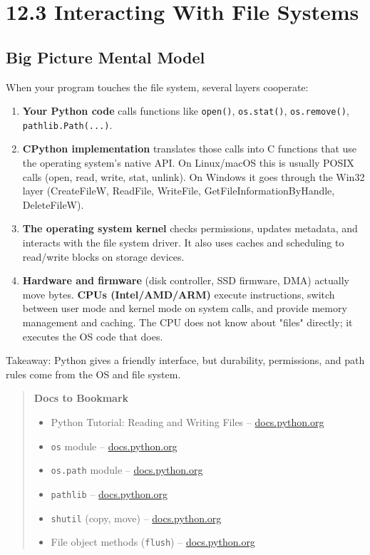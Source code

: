 \chapter{12.3 Interacting With File Systems}

\section*{Big Picture Mental Model}

When your program touches the file system, several layers cooperate:

\begin{enumerate}
  \item \textbf{Your Python code} calls functions like \texttt{open()}, \texttt{os.stat()}, \texttt{os.remove()}, \texttt{pathlib.Path(...)}.
  \item \textbf{CPython implementation} translates those calls into C functions that use the operating system's native API.
        On Linux/macOS this is usually POSIX calls (open, read, write, stat, unlink).
        On Windows it goes through the Win32 layer (CreateFileW, ReadFile, WriteFile, GetFileInformationByHandle, DeleteFileW).
  \item \textbf{The operating system kernel} checks permissions, updates metadata, and interacts with the file system driver.
        It also uses caches and scheduling to read/write blocks on storage devices.
  \item \textbf{Hardware and firmware} (disk controller, SSD firmware, DMA) actually move bytes.
        \textbf{CPUs (Intel/AMD/ARM)} execute instructions, switch between user mode and kernel mode on system calls,
        and provide memory management and caching. The CPU does not know about "files" directly; it executes the OS code that does.
\end{enumerate}

\noindent
Takeaway: Python gives a friendly interface, but durability, permissions, and path rules come from the OS and file system.

\begin{quote}
\textbf{Docs to Bookmark}
\begin{itemize}
  \item Python Tutorial: Reading and Writing Files -- \href{https://docs.python.org/3/tutorial/inputoutput.html#reading-and-writing-files}{docs.python.org}
  \item \texttt{os} module -- \href{https://docs.python.org/3/library/os.html}{docs.python.org}
  \item \texttt{os.path} module -- \href{https://docs.python.org/3/library/os.path.html}{docs.python.org}
  \item \texttt{pathlib} -- \href{https://docs.python.org/3/library/pathlib.html}{docs.python.org}
  \item \texttt{shutil} (copy, move) -- \href{https://docs.python.org/3/library/shutil.html}{docs.python.org}
  \item File object methods (\texttt{flush}) -- \href{https://docs.python.org/3/library/io.html}{docs.python.org}
\end{itemize}
\end{quote}


